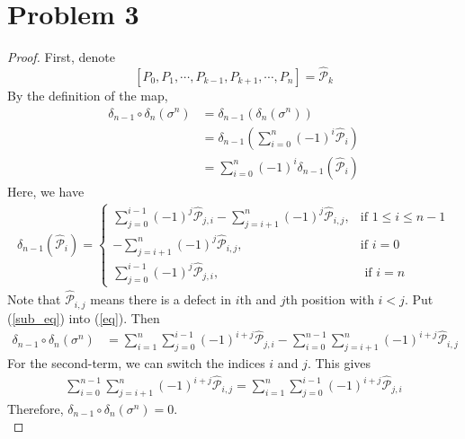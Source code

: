 \section*{Problem 3}
	\begin{proof}
		First, denote
		\begin{equation*}
			\left[P_0, P_1, \cdots, P_{k-1}, P_{k+1}, \cdots, P_n\right] = \widehat{\mathcal{P}}_k
		\end{equation*}
		By the definition of the map,
		\begin{align}
			\delta_{n-1}\circ\delta_n(\sigma^{n}) &= \delta_{n-1}\left(\delta_n(\sigma^{n})\right)\nonumber\\
			&= \delta_{n-1}\left(\sum\limits_{i=0}^n(-1)^i\widehat{\mathcal{P}}_i\right)\nonumber\\
			&= \sum\limits_{i=0}^n(-1)^i\delta_{n-1}\left(\widehat{\mathcal{P}}_i\right)\label{eq}
		\end{align}
		Here, we have
		\begin{align}
			\delta_{n-1}\left(\widehat{\mathcal{P}}_i\right) =
			\begin{cases}
				\sum\limits_{j=0}^{i-1} (-1)^j\widehat{\mathcal{P}}_{j, i} - \sum\limits_{j=i+1}^{n} (-1)^j\widehat{\mathcal{P}}_{i, j}, & \mbox{if }1\leq i\leq n-1 \\
				-\sum\limits_{j=i+1}^{n} (-1)^j\widehat{\mathcal{P}}_{i, j}, & \mbox{if }i = 0\\
				\sum\limits_{j=0}^{i-1} (-1)^j\widehat{\mathcal{P}}_{j, i}, & \mbox{ if } i = n
			\end{cases} \label{sub_eq}
		\end{align}
		Note that $\widehat{\mathcal{P}}_{i, j}$ means there is a defect in $i$th and $j$th position with $i < j$. Put (\ref{sub_eq}) into (\ref{eq}). Then
		\begin{align*}
			\delta_{n-1}\circ\delta_n(\sigma^{n}) &= \sum\limits_{i=1}^{n}\sum\limits_{j=0}^{i-1} (-1)^{i+j}\widehat{\mathcal{P}}_{j, i} - \sum\limits_{i=0}^{n-1}\sum\limits_{j=i+1}^{n} (-1)^{i+j}\widehat{\mathcal{P}}_{i, j}
		\end{align*}
		For the second-term, we can switch the indices $i$ and $j$. This gives
		\begin{align*}
			\sum\limits_{i=0}^{n-1}\sum\limits_{j=i+1}^{n} (-1)^{i+j}\widehat{\mathcal{P}}_{i, j} = \sum\limits_{i=1}^{n}\sum\limits_{j=0}^{i-1} (-1)^{i+j}\widehat{\mathcal{P}}_{j, i}
		\end{align*}
		Therefore, $\delta_{n-1}\circ\delta_n(\sigma^{n}) = 0$.\\
	\end{proof}